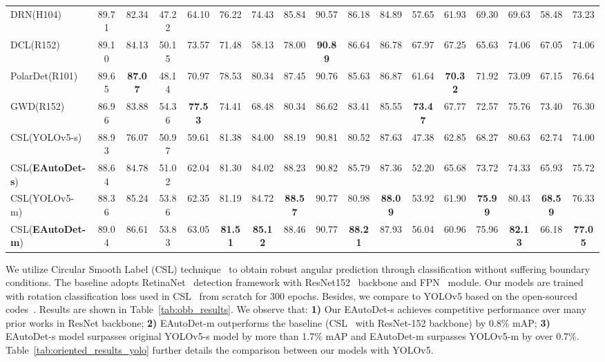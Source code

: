 \documentclass[letterpaper]{article} \usepackage{aaai22}  \usepackage{times}  \usepackage{helvet}  \usepackage{courier}  \usepackage[hyphens]{url}  \usepackage{graphicx} \urlstyle{rm} \def\UrlFont{\rm}  \usepackage{natbib}  \usepackage{caption} \DeclareCaptionStyle{ruled}{labelfont=normalfont,labelsep=colon,strut=off} \frenchspacing  \setlength{\pdfpagewidth}{8.5in}  \setlength{\pdfpageheight}{11in}
\begin{document}
\begin{table*}[tb!]
{\begin{tabular}{lcccccccccccccccc}
DRN(H104)~\citeyearpar{pan2020dynamic} & 89.71 & 82.34 & 47.22 & 64.10 & 76.22 & 74.43 & 85.84 & 90.57 & 86.18 & 84.89 & 57.65 & 61.93 & 69.30 & 69.63 & 58.48 & 73.23 \\
DCL(R152)~\citeyearpar{yang2021dense} & 89.10 & 84.13 & 50.15 & 73.57 & 71.48 & 58.13 & 78.00 & \textbf{90.89} & 86.64 & 86.78 & 67.97 & 67.25 & 65.63 & 74.06 & 67.05 & 74.06 \\
PolarDet(R101)~\citeyearpar{zhao2021polardet} & 89.65 & \textbf{87.07} & 48.14 & 70.97 & 78.53 & 80.34 & 87.45 & 90.76 & 85.63 & 86.87 & 61.64 & \textbf{70.32} & 71.92 & 73.09 & 67.15 & 76.64 \\
GWD(R152)~\citeyearpar{yang2021rethinking} &  86.96 & 83.88 & 54.36 & \textbf{77.53} & 74.41 &	68.48 &	80.34 &	86.62 &	83.41 &	85.55 &	\textbf{73.47} &	67.77 &	72.57 &	75.76 & 73.40 & 76.30 \\
\midrule
CSL(YOLOv5-s)~\citeyearpar{yolov5obb} & 88.93 & 76.07 & 50.97 & 59.61 & 81.38 & 84.00 & 88.19 & 90.81 & 80.52 & 87.63 & 47.38 & 62.85 & 68.27 & 80.63 & 62.74 & 74.00 \\
CSL(\textbf{EAutoDet-s}) & 88.64 & 84.78 & 51.02 & 62.04 & 81.30 & 84.02 & 88.23 & 90.82 & 85.79 & 87.36 & 52.20 & 65.68 & 73.72 & 74.33 & 65.93 & 75.72 \\
CSL(YOLOv5-m)~\citeyearpar{yolov5obb} & 88.36 & 85.24 & 53.86 & 62.35 & 81.19 & 84.72 & \textbf{88.57} & 90.77 & 80.98 & \textbf{88.09} & 53.92 & 61.90 & \textbf{75.99} & 80.43 & \textbf{68.59} & 76.33 \\
CSL(\textbf{EAutoDet-m}) & 89.04 & 86.61 & 53.83 & 63.05 & \textbf{81.51} & \textbf{85.12} & 88.46 & 90.77 & \textbf{88.21} & 87.93 & 56.04 & 60.96 & 75.96 & \textbf{82.13} & 66.18 & \textbf{77.05} \\
\bottomrule
\end{tabular}
}
\end{table*}

We utilize Circular Smooth Label (CSL) technique~\cite{csl} to obtain robust angular prediction through classification without suffering boundary conditions. The baseline adopts RetinaNet~\cite{retinanet} detection framework with ResNet152~\cite{resnet} backbone and FPN~\cite{lin2017feature} module. Our models are trained with rotation classification loss used in CSL~\cite{csl} from scratch for 300 epochs. Besides, we compare to YOLOv5 based on the open-sourced codes~\cite{yolov5obb}. Results are shown in Table~\ref{tab:obb_results}. We observe that: \textbf{1)} Our EAutoDet-s achieves competitive performance over many prior works in ResNet backbone;
\textbf{2)} EAutoDet-m outperforms the baseline (CSL~\cite{csl} with ResNet-152 backbone) by 0.8\% mAP; \textbf{3)} EAutoDet-s model surpasses original YOLOv5-s model by more than 1.7\% mAP and EAutoDet-m surpasses YOLOv5-m by over 0.7\%.
Table~\ref{tab:oriented_results_yolo} further details the comparison between our models with YOLOv5.
\end{document}
